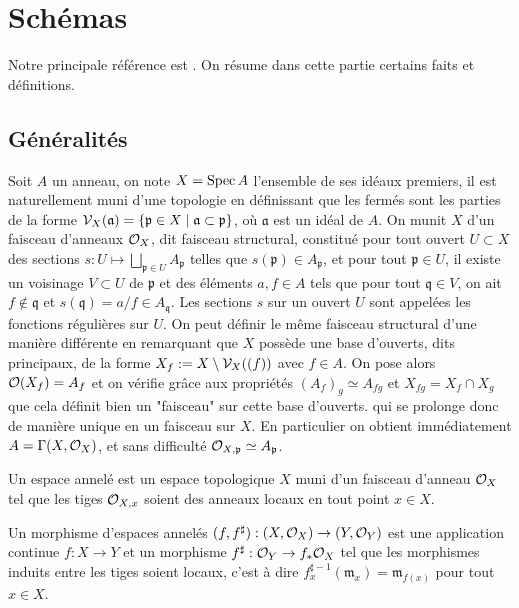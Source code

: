\section{Schémas}

Notre principale référence est \cite{Hartshorne}. On résume dans cette partie certains faits et définitions. 

\subsection{Généralités}

Soit $A$ un anneau, on note $X=\operatorname{Spec} A$ l'ensemble de ses idéaux premiers, il est naturellement muni d'une topologie en définissant que les fermés sont les parties de la forme $\mathcal{V}_X(\mathfrak{a})=\lbrace \mathfrak{p}\in X\mid \mathfrak{a}\subset \mathfrak{p}\rbrace$, où $\mathfrak{a}$ est un idéal de $A$. On munit $X$ d'un faisceau d'anneaux $\mathcal{O}_X$, dit faisceau structural, constitué pour tout ouvert $U\subset X$ des sections $s: U\mapsto \bigsqcup_{\mathfrak{p}\in U}A_\mathfrak{p}$ telles que $s(\mathfrak{p})\in A_\mathfrak{p}$, et pour tout $\mathfrak{p}\in U$, il existe un voisinage $V\subset U$ de $\mathfrak{p}$ et des éléments $a,f\in A$ tels que pour tout $\mathfrak{q}\in V$, on ait $f\notin \mathfrak{q}$ et $s(\mathfrak{q})=a/f\in A_\mathfrak{q}$. Les sections $s$ sur un ouvert $U$ sont appelées les fonctions régulières sur $U$. On peut définir le même faisceau structural d'une manière différente en remarquant que $X$ possède une base d'ouverts, dits principaux, de la forme $X_f:=X\setminus \mathcal{V}_X((f))$ avec $f\in A$. On pose alors $\mathcal{O}(X_f)=A_f$ et on vérifie grâce aux propriétés $(A_f)_g\simeq A_{fg}$ et $X_{fg}=X_f\cap X_g$ que cela définit bien un "faisceau" sur cette base d'ouverts. qui se prolonge donc de manière unique en un faisceau sur $X$. En particulier on obtient immédiatement $A=\Gamma(X, \mathcal{O}_X)$, et sans difficulté $\mathcal{O}_{X,\mathfrak{p}}\simeq A_\mathfrak{p}$. 

\begin{defn}
Un espace annelé est un espace topologique $X$ muni d'un faisceau d'anneau $\mathcal{O}_X$ tel que les tiges $\mathcal{O}_{X,x}$ soient des anneaux locaux en tout point $x\in X$.

Un morphisme d'espaces annelés $(f, f^\sharp):(X,\mathcal{O}_X)\rightarrow (Y,\mathcal{O}_Y)$ est une application continue $f:X\rightarrow Y$ et un morphisme $f^\sharp:\mathcal{O}_Y\rightarrow f_*\mathcal{O}_X$ tel que les morphismes induits entre les tiges soient locaux, c'est à dire $f^{\sharp -1}_x(\mathfrak{m}_x)=\mathfrak{m}_{f(x)}$ pour tout $x\in X$.
\end{defn}


